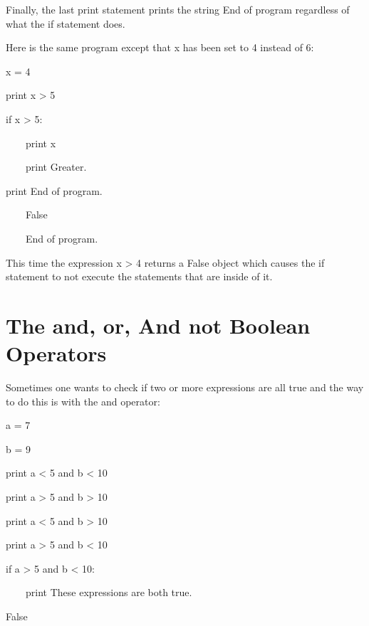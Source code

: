 \documentclass[12pt,twoside]{book}
\begin{document}
\bigskip

Finally, the last print statement prints the string {\textquotedbl}End of program{\textquotedbl} regardless of what the if statement does. 

\bigskip

Here is the same program except that x has been set to 4 instead of 6:


\bigskip

x = 4


\bigskip

print x {\textgreater} 5


\bigskip

if x {\textgreater} 5:

\ \ \ \ print x

\ \ \ \ print {\textquotedbl}Greater.{\textquotedbl}


\bigskip

print {\textquotedbl}End of program.{\textquotedbl}

{\textbar}

\ \ \ \ False

\ \ \ \ End of program.

This time the expression x {\textgreater} 4 returns a False object which causes the if statement to not execute the statements that are inside of it.

\section[The and, or, And not Boolean Operators]{The and, or, And not Boolean Operators}

Sometimes one wants to check if two or more expressions are all true and the way to do this is with the and operator: 

\bigskip

a = 7

b = 9

print a {\textless} 5 and b {\textless} 10

print a {\textgreater} 5 and b {\textgreater} 10

print a {\textless} 5 and b {\textgreater} 10

print a {\textgreater} 5 and b {\textless} 10

if a {\textgreater} 5 and b {\textless} 10:

\ \ \ \ print {\textquotedbl}These expressions are both
true.{\textquotedbl}

{\textbar}

False
\end{document}
